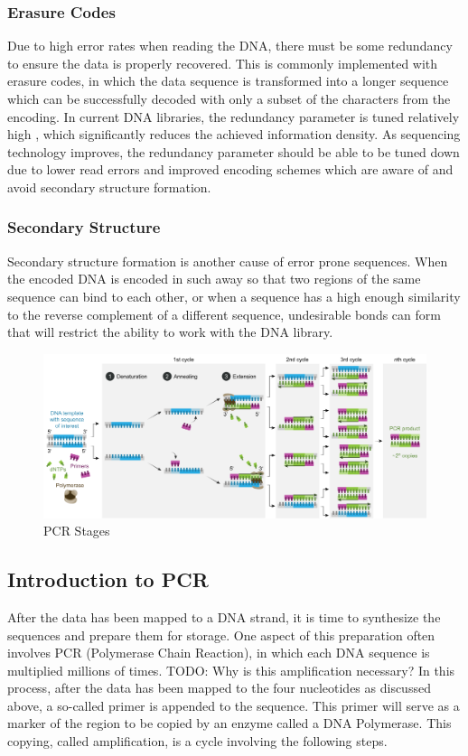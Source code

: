 \documentclass[a4paper,conference]{IEEEtran}
\begin{document}
\subsubsection{Erasure Codes}
Due to high error rates when reading the DNA, there must be some redundancy to ensure the data is properly recovered. This is commonly implemented with erasure codes, in which the data sequence is transformed into a longer sequence which can be successfully decoded with only a subset of the characters from the encoding. In current DNA libraries, the redundancy parameter is tuned relatively high \cite{}, which significantly reduces the achieved information density. As sequencing technology improves, the redundancy parameter should be able to be tuned down \cite{} due to lower read errors and improved encoding schemes which are aware of and avoid secondary structure formation.

\subsubsection{Secondary Structure}
Secondary structure formation is another cause of error prone sequences. When the encoded DNA is encoded in such away so that two regions of the same sequence can bind to each other, or when a sequence has a high enough similarity to the reverse complement of a different sequence, undesirable bonds can form that will restrict the ability to work with the DNA library.


\begin{figure}[!t]
\centering
\includegraphics[width=4.5in,angle=90,origin=c]{pcr}
\caption{PCR Stages}
\label{fig_sim}
\end{figure}


\subsection{Introduction to PCR}

After the data has been mapped to a DNA strand, it is time to synthesize the sequences and prepare them for storage. One aspect of this preparation often involves PCR (Polymerase Chain Reaction), in which each DNA sequence is multiplied millions of times. TODO: Why is this amplification necessary? In this process, after the data has been mapped to the four nucleotides as discussed above, a so-called primer is appended to the sequence. This primer will serve as a marker of the region to be copied by an enzyme called a DNA Polymerase. This copying, called amplification, is a cycle involving the following steps. \\
\end{document}
